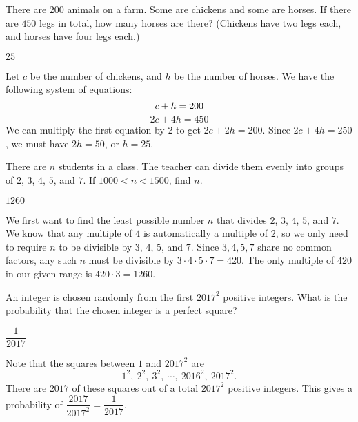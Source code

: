 \documentclass[11pt]{article}
\begin{document}
\setlength{\parindent}{0pt}

\begin{problem}
There are $200$ animals on a farm. Some are chickens and some are horses. If there are $450$ legs in total, how many horses are there?
(Chickens have two legs each, and horses have four legs each.)
\end{problem}

\begin{answer}
$25$
\end{answer}

\begin{solution}
Let $c$ be the number of chickens, and $h$ be the number of horses. We have the following system of equations:
\begin{equation}
c+h = 200 \\
\end{equation}
\begin{equation}
2c + 4h = 450
\end{equation}
We can multiply the first equation by 2 to get $2c + 2h = 200$. Since $2c + 4h = 250$, we must have $2h = 50$, or $h = \boxed{25}$.
\end{solution}


\begin{problem}
There are $n$ students in a class. The teacher can divide them evenly into groups of $2$, $3$, $4$, $5$, and $7$. If $1000 < n < 1500$, find $n$.
\end{problem}

\begin{answer}
$1260$
\end{answer}

\begin{solution}
We first want to find the least possible number $n$ that divides $2$, $3$, $4$, $5$, and $7$. 
We know that any multiple of $4$ is automatically a multiple of $2$, so we only need to require $n$ to be divisible by $3$, $4$, $5$, and $7$. 
Since $3,4,5,7$ share no common factors, any such $n$ must be divisible by $3 \cdot 4 \cdot 5 \cdot 7 = 420$. 
The only multiple of $420$ in our given range is $420 \cdot 3 = \boxed{1260}$.
\end{solution}


\begin{problem}
An integer is chosen randomly from the first $2017^2$ positive integers. What is the probability that the chosen integer is a perfect square?
\end{problem}
\begin{answer}
$\dfrac{1}{2017}$
\end{answer}
\begin{solution}
Note that the squares between $1$ and $2017^2$ are \[1^2,\ 2^2,\ 3^2,\ \cdots,\ 2016^2,\ 2017^2.\]
There are $2017$ of these squares out of a total $2017^2$ positive integers. 
This gives a probability of $\dfrac{2017}{2017^2} = \boxed{\dfrac{1}{2017}}$.
\end{solution}
\end{document}

